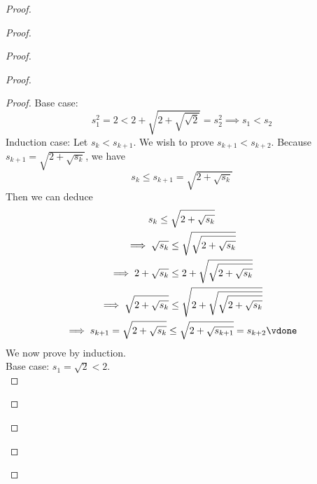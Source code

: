 \documentclass{report}
\begin{document}
\begin{proof}
\begin{proof}
\begin{proof}
\begin{proof}
\begin{proof}
Base case:
\begin{equation}
s_1^2=2<2+\sqrt{2+\sqrt{\sqrt{2} } }=s_2^2 \implies s_1<s_2
\end{equation}
Induction case: Let $s_k<s_{k+1}$. We wish to prove $s_{k+1}<s_{k+2}$. Because $s_{k+1}=\sqrt{2+\sqrt{s_k} } $, we have
\begin{equation}
s_k\leq s_{k+1}=\sqrt{2+\sqrt{s_k} } 
\end{equation}
Then we can deduce
\begin{gather}
s_k\leq \sqrt{2+\sqrt{s_k} } \\
\implies \sqrt{s_k}\leq \sqrt{\sqrt{2+\sqrt{s_k} } }\\
\implies 2+\sqrt{s_k}\leq 2+\sqrt{\sqrt{2+\sqrt{s_k} } }\\
\implies \sqrt{2+\sqrt{s_k} }\leq \sqrt{2+\sqrt{\sqrt{2+\sqrt{s_k} } } }\\
\implies s_{k+1}=\sqrt{2+\sqrt{s_k} }\leq \sqrt{2+\sqrt{s_{k+1}} }=s_{k+2}\vdone
\end{gather}
We now prove  by induction.\\

Base case: $s_1=\sqrt{2}<2$.\\


\end{proof}
\end{proof}
\end{proof}
\end{proof}
\end{proof}
\end{document}
